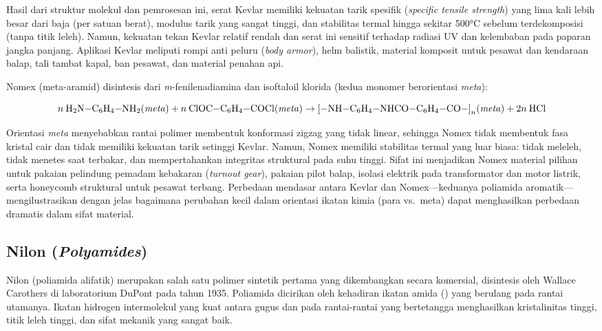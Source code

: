 \documentclass[12pt,a4paper,openany]{book}
\begin{document}
Hasil dari struktur molekul dan pemrosesan ini, serat Kevlar memiliki kekuatan tarik spesifik (\textit{specific tensile strength}) yang lima kali lebih besar dari baja (per satuan berat), modulus tarik yang sangat tinggi, dan stabilitas termal hingga sekitar 500°C sebelum terdekomposisi (tanpa titik leleh). Namun, kekuatan tekan Kevlar relatif rendah dan serat ini sensitif terhadap radiasi UV dan kelembaban pada paparan jangka panjang. Aplikasi Kevlar meliputi rompi anti peluru (\textit{body armor}), helm balistik, material komposit untuk pesawat dan kendaraan balap, tali tambat kapal, ban pesawat, dan material penahan api.

Nomex (meta-aramid) disintesis dari \textit{m}-fenilenadiamina dan isoftaloil klorida (kedua monomer berorientasi \textit{meta}):

\begin{equation}
n\:\ce{H2N-C6H4-NH2}\text{(\textit{meta})} + n\:\ce{ClOC-C6H4-COCl}\text{(\textit{meta})} \rightarrow \ce{[-NH-C6H4-NHCO-C6H4-CO-]}_n\text{(\textit{meta})} + 2n\:\ce{HCl}
\end{equation}

Orientasi \textit{meta} menyebabkan rantai polimer membentuk konformasi zigzag yang tidak linear, sehingga Nomex tidak membentuk fasa kristal cair dan tidak memiliki kekuatan tarik setinggi Kevlar. Namun, Nomex memiliki stabilitas termal yang luar biasa: tidak meleleh, tidak menetes saat terbakar, dan mempertahankan integritas struktural pada suhu tinggi. Sifat ini menjadikan Nomex material pilihan untuk pakaian pelindung pemadam kebakaran (\textit{turnout gear}), pakaian pilot balap, isolasi elektrik pada transformator dan motor listrik, serta honeycomb struktural untuk pesawat terbang. Perbedaan mendasar antara Kevlar dan Nomex---keduanya poliamida aromatik---mengilustrasikan dengan jelas bagaimana perubahan kecil dalam orientasi ikatan kimia (para vs.\ meta) dapat menghasilkan perbedaan dramatis dalam sifat material.

\subsection{Nilon (\textit{Polyamides})}
\label{subsec:nilon}

Nilon (poliamida alifatik) merupakan salah satu polimer sintetik pertama yang dikembangkan secara komersial, disintesis oleh Wallace Carothers di laboratorium DuPont pada tahun 1935. Poliamida dicirikan oleh kehadiran ikatan amida () yang berulang pada rantai utamanya. Ikatan hidrogen intermolekul yang kuat antara gugus  dan  pada rantai-rantai yang bertetangga menghasilkan kristalinitas tinggi, titik leleh tinggi, dan sifat mekanik yang sangat baik.
\end{document}
